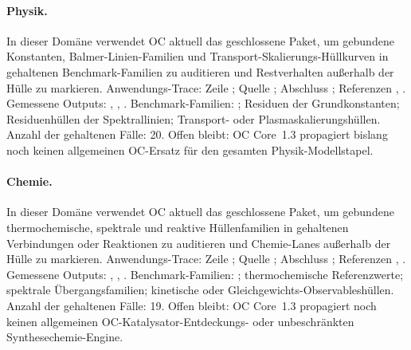 \paragraph{Physik.}
In dieser Domäne verwendet OC aktuell das geschlossene Paket, um gebundene Konstanten, Balmer-Linien-Familien und Transport-Skalierungs-Hüllkurven in gehaltenen Benchmark-Familien zu auditieren und Restverhalten außerhalb der Hülle zu markieren.
Anwendungs-Trace: Zeile ; \allowbreak Quelle ; \allowbreak Abschluss ; \allowbreak Referenzen , \allowbreak {}.
Gemessene Outputs: , , .
Benchmark-Familien: ; Residuen der Grundkonstanten; Residuenhüllen der Spektrallinien; Transport- oder Plasmaskalierungshüllen.
Anzahl der gehaltenen Fälle: 20.
Offen bleibt: OC Core~1.3 propagiert bislang noch keinen allgemeinen OC-Ersatz für den gesamten Physik-Modellstapel.

\paragraph{Chemie.}
In dieser Domäne verwendet OC aktuell das geschlossene Paket, um gebundene thermochemische, spektrale und reaktive Hüllenfamilien in gehaltenen Verbindungen oder Reaktionen zu auditieren und Chemie-Lanes außerhalb der Hülle zu markieren.
Anwendungs-Trace: Zeile ; \allowbreak Quelle ; \allowbreak Abschluss ; \allowbreak Referenzen , \allowbreak {}.
Gemessene Outputs: , , .
Benchmark-Familien: ; thermochemische Referenzwerte; spektrale Übergangsfamilien; kinetische oder Gleichgewichts-\allowbreak Observableshüllen.
Anzahl der gehaltenen Fälle: 19.
Offen bleibt: OC Core~1.3 propagiert noch keinen allgemeinen OC-Katalysator-Entdeckungs- oder unbeschränkten Synthesechemie-Engine.

